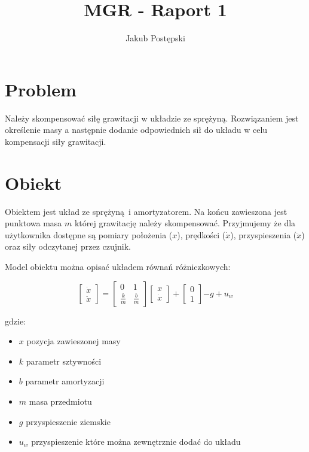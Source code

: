 \documentclass[a4paper]{article}
\title{MGR - Raport 1}
\author{Jakub Postępski}
\begin{document}
\maketitle

\section{Problem}
Należy skompensować siłę grawitacji w układzie ze sprężyną. Rozwiązaniem jest określenie masy a następnie dodanie odpowiednich sił do układu w celu kompensacji siły grawitacji.

\section{Obiekt}
Obiektem jest układ ze sprężyną i amortyzatorem. Na końcu zawieszona jest punktowa masa $m$ której grawitację należy skompensować. Przyjmujemy że dla użytkownika dostępne są pomiary położenia ($x$), prędkości ($\dot{x}$), przyspieszenia ($\ddot{x}$) oraz siły odczytanej przez czujnik.

Model obiektu można opisać układem równań różniczkowych:

\begin{equation}
	\begin{bmatrix}
	    \dot{x} \\
	    \ddot{x}
	\end{bmatrix}
	=
	\begin{bmatrix}
	    0 & 1 \\
	    \frac{k}{m} & \frac{b}{m}
	\end{bmatrix}
	\begin{bmatrix}
		x \\
	    \dot{x}
	\end{bmatrix}
	+
	\begin{bmatrix}
	    0 \\
	    1
	\end{bmatrix}
	{-g + u_w}
\end{equation}

gdzie:
\begin{itemize}
	\item $x$ pozycja zawieszonej masy
	\item $k$ parametr sztywności
	\item $b$ parametr amortyzacji
	\item $m$ masa przedmiotu
	\item $g$ przyspieszenie ziemskie
	\item $u_w$ przyspieszenie które można zewnętrznie dodać do układu
\end{itemize}
\end{document}
